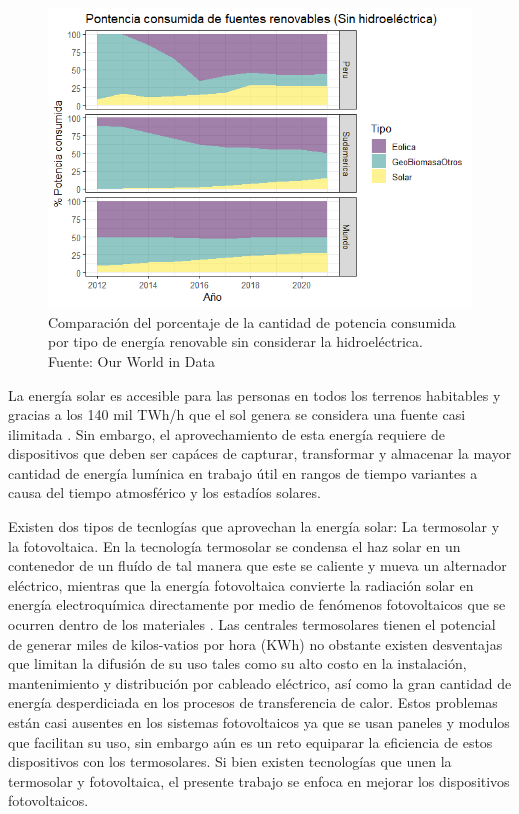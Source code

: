 \begin{figure}[h]
    \includegraphics[scale=0.8]{img/PorcentajeRenovable.png}
    \caption{Comparación del porcentaje de la cantidad de potencia consumida por tipo de energía renovable sin considerar la hidroeléctrica.
    Fuente: Our World in Data \cite{owidenergy}}
    \label{img:PorcentajeRenovable}
\end{figure}

La energía solar es accesible para las personas en todos los terrenos habitables y gracias a los 140 mil TWh/h que el sol genera se considera una fuente casi ilimitada \cite{hammarstrom2012}.
Sin embargo, el aprovechamiento de esta energía requiere de dispositivos que deben ser capáces de capturar, transformar 
y almacenar la mayor cantidad de energía lumínica en trabajo útil en rangos de tiempo variantes a causa del tiempo atmosférico y
los estadíos solares.


Existen dos tipos de tecnlogías que aprovechan la energía solar: La termosolar y la fotovoltaica. En la tecnología termosolar se condensa el haz solar en un contenedor de un fluído de tal manera que este se caliente
y mueva un alternador eléctrico, mientras que la energía fotovoltaica convierte la radiación solar en energía electroquímica directamente 
por medio de fenómenos fotovoltaicos que se ocurren dentro de los materiales .
Las centrales termosolares tienen el potencial de generar miles de kilos-vatios por hora (KWh) no obstante 
existen desventajas que limitan la difusión de su uso tales como su alto costo en la instalación, mantenimiento y distribución por cableado 
eléctrico, así como la gran cantidad de energía desperdiciada en los procesos de transferencia de calor. Estos problemas están casi ausentes
en los sistemas fotovoltaicos ya que se usan paneles y modulos que facilitan su uso, sin embargo aún es un reto equiparar la eficiencia de estos dispositivos con los termosolares. Si bien existen tecnologías que unen la termosolar y fotovoltaica, el presente trabajo se enfoca en mejorar los dispositivos fotovoltaicos.

